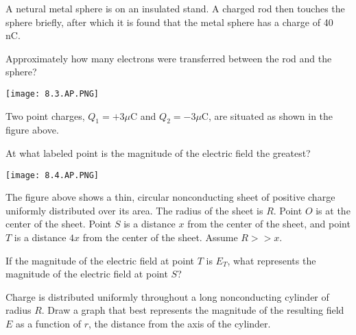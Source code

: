 \documentclass[../em.tex]{subfiles}
\begin{document}
\ex A netural metal sphere is on an insulated stand. A charged rod then touches the sphere briefly, after which it is found that the metal sphere has a charge of 40 nC. 

Approximately how many electrons were transferred between the rod and the sphere?

\ex \begin{center}
    \texttt{[image: 8.3.AP.PNG]}
\end{center}
Two point charges, $Q_1=+3\mu$C and $Q_2=-3\mu$C, are situated as shown in the figure above. 

At what labeled point is the magnitude of the electric field the greatest?

\ex \begin{center}
    \texttt{[image: 8.4.AP.PNG]}
\end{center}
The figure above shows a thin, circular nonconducting sheet of positive charge uniformly distributed over its area. The radius of the sheet is $R$. Point $O$ is at the center of the sheet.
Point $S$ is a distance $x$ from the center of the sheet, and point $T$ is a distance $4x$ from the center of the sheet. Assume $R>>x$. 

If the magnitude of the electric field at point $T$ is $E_T$, what represents the magnitude of the electric field at point $S$?

\ex Charge is distributed uniformly throughout a long nonconducting cylinder of radius $R$. Draw a graph that best represents the magnitude of the resulting field $E$ as a function of $r$, the distance from the axis of the cylinder.
\end{document}
